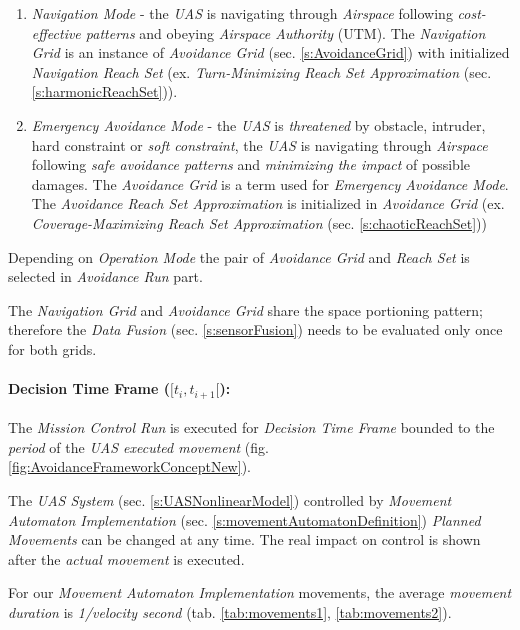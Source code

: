 \begin{enumerate}
    \item \emph{Navigation Mode} - the \emph{UAS} is navigating through \emph{Airspace} following \emph{cost-effective patterns} and obeying \emph{Airspace Authority} (UTM). The \emph{Navigation Grid} is an instance of \emph{Avoidance Grid} (sec. \ref{s:AvoidanceGrid}) with initialized \emph{Navigation Reach Set} (ex. \emph{Turn-Minimizing Reach Set Approximation} (sec. \ref{s:harmonicReachSet})).
    
    \item \emph{Emergency Avoidance Mode} - the \emph{UAS} is \emph{threatened} by obstacle, intruder, hard constraint or \emph{soft constraint}, the \emph{UAS} is navigating through \emph{Airspace} following \emph{safe avoidance patterns} and \emph{minimizing the impact} of possible damages. The \emph{Avoidance Grid} is a term used for \emph{Emergency Avoidance Mode}. The \emph{Avoidance Reach Set Approximation} is initialized in \emph{Avoidance Grid} (ex. \emph{Coverage-Maximizing Reach Set Approximation} (sec. \ref{s:chaoticReachSet}))
\end{enumerate}

\begin{note}
    Depending on \emph{Operation Mode} the pair of \emph{Avoidance Grid} and \emph{Reach Set} is selected in \emph{Avoidance Run} part.
    
    
    The \emph{Navigation Grid} and \emph{Avoidance Grid} share the space portioning pattern; therefore the \emph{Data Fusion} (sec. \ref{s:sensorFusion}) needs to be evaluated only once for both grids. 
\end{note}



\paragraph{Decision Time Frame ($[t_i,t_{i+1}[$):} The \emph{Mission Control Run} is executed for \emph{Decision Time Frame} bounded to the \emph{period} of the \emph{UAS executed movement} (fig. \ref{fig:AvoidanceFrameworkConceptNew}).

The \emph{UAS System} (sec. \ref{s:UASNonlinearModel}) controlled by \emph{Movement Automaton Implementation} (sec. \ref{s:movementAutomatonDefinition}) \emph{Planned Movements} can be changed at any time. The real impact on control is shown after the \emph{actual movement} is executed. 

\begin{note}
    For our \emph{Movement Automaton Implementation} movements, the average \emph{movement duration} is \emph{1/velocity second} (tab. \ref{tab:movements1}, \ref{tab:movements2}).
\end{note}

